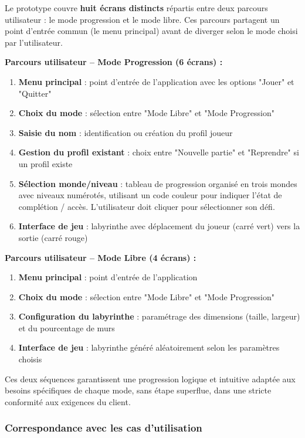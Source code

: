 \documentclass{butexFR}
\begin{document}
Le prototype couvre \textbf{huit écrans distincts} répartis entre deux parcours utilisateur : le mode progression et le mode libre. Ces parcours partagent un point d'entrée commun (le menu principal) avant de diverger selon le mode choisi par l'utilisateur.

\textbf{Parcours utilisateur -- Mode Progression (6 écrans) :}

\begin{enumerate}
    \item \textbf{Menu principal} : point d'entrée de l'application avec les options "Jouer" et "Quitter"
    \item \textbf{Choix du mode} : sélection entre "Mode Libre" et "Mode Progression"
    \item \textbf{Saisie du nom} : identification ou création du profil joueur
    \item \textbf{Gestion du profil existant} : choix entre "Nouvelle partie" et "Reprendre" si un profil existe
    \item \textbf{Sélection monde/niveau} : tableau de progression organisé en trois mondes avec niveaux numérotés, utilisant un code couleur pour indiquer l'état de complétion / accès. L'utilisateur doit cliquer pour sélectionner son défi.
    \item \textbf{Interface de jeu} : labyrinthe avec déplacement du joueur (carré vert) vers la sortie (carré rouge)
\end{enumerate}

\textbf{Parcours utilisateur -- Mode Libre (4 écrans) :}

\begin{enumerate}
    \item \textbf{Menu principal} : point d'entrée de l'application
    \item \textbf{Choix du mode} : sélection entre "Mode Libre" et "Mode Progression"
    \item \textbf{Configuration du labyrinthe} : paramétrage des dimensions (taille, largeur) et du pourcentage de murs
    \item \textbf{Interface de jeu} : labyrinthe généré aléatoirement selon les paramètres choisis
\end{enumerate}

Ces deux séquences garantissent une progression logique et intuitive adaptée aux besoins spécifiques de chaque mode, sans étape superflue, dans une stricte conformité aux exigences du client.

\subsubsection{Correspondance avec les cas d'utilisation}
\end{document}
